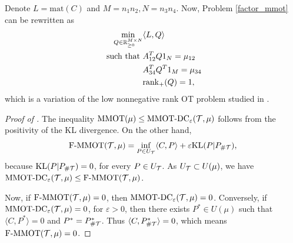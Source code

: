 Denote $L= \text{mat}(C)$ and $M = n_1 n_2, N = n_3 n_4$. Now, Problem \eqref{factor_mmot} can be rewritten as
\begin{align}
  \min_{Q \in \mathbb R^{M \times N}_{\geq 0}} &\langle L, Q \rangle \\
  \text{ such that } & A_{12}^T Q 1_N = \mu_{12} \\
  &A_{34}^T Q^T 1_M = \mu_{34} \\
  &\text{rank}_{+}(Q) = 1,
\end{align}
which is a variation of the low nonnegative rank OT problem studied in \citep{Meyer21a}.


\begin{proof}[Proof of ]
  The inequality
  $\text{MMOT}(\mu) \leq \text{MMOT-DC}_{\varepsilon}(\mathcal T, \mu)$ follows from
  the positivity of the KL divergence. On the other hand,
  \begin{equation}
    \text{F-MMOT}(\mathcal T, \mu) =
    \inf_{P \in U_{\mathcal T}} \langle C, P \rangle + \varepsilon \text{KL}(P \vert P_{\# \mathcal T}),
  \end{equation}
  because $\text{KL}(P \vert P_{\# \mathcal T}) = 0$, for every $P \in U_{\mathcal T}$. As
  $U_{\mathcal T} \subset U(\mu)$, we have
  $\text{MMOT-DC}_{\varepsilon}(\mathcal T, \mu) \leq \text{F-MMOT}(\mathcal T, \mu)$.

  Now, if $\text{F-MMOT}(\mathcal T, \mu) = 0$, then $\text{MMOT-DC}_{\varepsilon}(\mathcal T, \mu) = 0$. Conversely,
  if $\text{MMOT-DC}_{\varepsilon}(\mathcal T, \mu) = 0$, for $\varepsilon > 0$,
  then there exists $P^* \in U(\mu)$ such that $\langle C, P^* \rangle = 0$ and $P^* = P^*_{\# \mathcal T}$.
  Thus $\langle C, P^*_{\# \mathcal T} \rangle = 0$, which means $\text{F-MMOT}(\mathcal T, \mu) = 0$.
\end{proof}

